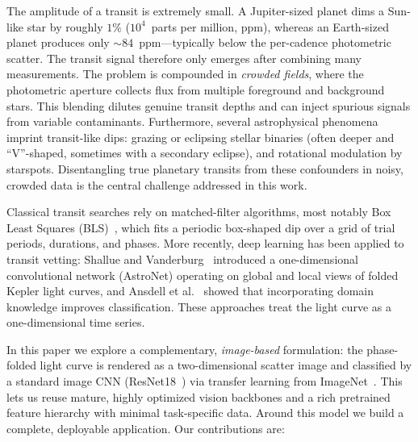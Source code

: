 \documentclass[twocolumn,10pt]{article}
\begin{document}
The amplitude of a transit is extremely small. A Jupiter-sized planet dims a
Sun-like star by roughly $1\%$ ($10^{4}$~parts per million, ppm), whereas an
Earth-sized planet produces only ${\sim}84$~ppm---typically below the per-cadence
photometric scatter. The transit signal therefore only emerges after combining
many measurements. The problem is compounded in \emph{crowded fields}, where the
photometric aperture collects flux from multiple foreground and background stars.
This blending dilutes genuine transit depths and can inject spurious signals from
variable contaminants. Furthermore, several astrophysical phenomena imprint
transit-like dips: grazing or eclipsing stellar binaries (often deeper and
``V''-shaped, sometimes with a secondary eclipse), and rotational modulation by
starspots. Disentangling true planetary transits from these confounders in noisy,
crowded data is the central challenge addressed in this work.

Classical transit searches rely on matched-filter algorithms, most notably Box
Least Squares (BLS)~\cite{kovacs2002}, which fits a periodic box-shaped dip over a
grid of trial periods, durations, and phases. More recently, deep learning has
been applied to transit vetting: Shallue and Vanderburg~\cite{shallue2018} introduced a one-dimensional
convolutional network (AstroNet) operating on global and local views of folded
Kepler light curves, and Ansdell et al.~\cite{ansdell2018} showed that
incorporating domain knowledge improves classification. These approaches treat the
light curve as a one-dimensional time series.

In this paper we explore a complementary, \emph{image-based} formulation: the
phase-folded light curve is rendered as a two-dimensional scatter image and
classified by a standard image CNN (ResNet18~\cite{he2016}) via transfer learning
from ImageNet~\cite{deng2009}. This lets us reuse mature, highly optimized vision
backbones and a rich pretrained feature hierarchy with minimal task-specific data.
Around this model we build a complete, deployable application. Our contributions
are:
\end{document}
